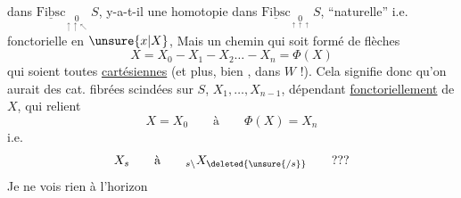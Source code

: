 dans $\underline{\mathrm{Fibsc}}_{\underset{\uparrow\uparrow\nwarrow}{0}}\,S$, y-a-t-il une homotopie dans $\underline{\mathrm{Fibsc}}_{\underset{\uparrow\uparrow\uparrow}{0}}\,S$, ``naturelle'' i.e. fonctorielle en $\unsure{x|X}$,
Mais un chemin qui soit formé de flèches
\[
 X=X_0\mathbin{-}X_1\mathbin{-}X_2\ldots\mathbin{-}X_n=\Phi(X)
\]
qui soient toutes \uline{cartésiennes} (et  plus, bien , dans $W$ !). Cela signifie donc qu'on  aurait des  cat. fibrées scindées sur $S$, $X_1,\ldots,X_{n-1}$, dépendant \uline{fonctoriellement} de $X$, qui relient
\[
 X=X_0\qquad \text{à}\qquad \Phi(X)=X_n
\]
i.e.
\[
 X_s\qquad\text{à}\qquad {}_{s\backslash}X_{\deleted{\unsure{/s}}}\qquad ???
\]
Je ne vois rien à l'horizon
